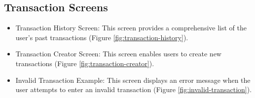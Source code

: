 \newpage
\subsection{Transaction Screens}

\begin{itemize}
\item Transaction History Screen: This screen provides a comprehensive list of the user's past transactions (Figure \ref{fig:transaction-history}).
\item Transaction Creator Screen: This screen enables users to create new transactions (Figure \ref{fig:transaction-creator}).
\item Invalid Transaction Example: This screen displays an error message when the user attempts to enter an invalid transaction (Figure \ref{fig:invalid-transaction}).
\end{itemize}

